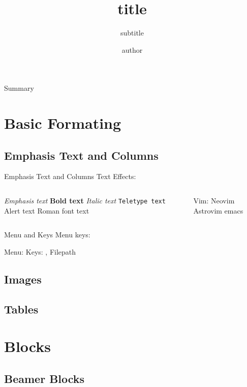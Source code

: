 \documentclass[aspectratio=169,tokyonightday,12pt]{darkbeamer}
\author{author}
\title{title}
\subtitle{subtitle}
\institute{My University}
\begin{document}
\begin{frame}{}
	\titlepage
\end{frame}

\begin{frame}{Summary}
	\tableofcontents
\end{frame}

\section{Basic Formating}
\subsection{Emphasis Text and Columns}
\begin{frame}{Emphasis Text and Columns}
	Text Effects:
	\begin{columns}[c]
		\begin{outline}
			\1 \emph{Emphasis text}
			\1 \textbf{Bold text}
			\1 \textit{Italic text}
			\1 \texttt{Teletype text}
			\1 \alert{Alert text}
			\1 \textrm{Roman font text}
		\end{outline}
		\column{.45\textwidth}
		\begin{outline}[enumerate]
			\1 Vim:
			\2 Neovim
			\2 Astrovim
			\1 emacs
		\end{outline}
	\end{columns}
\end{frame}

\begin{frame}{Menu and Keys}
    Menu keys:
    \begin{outline}
        \1 Menu: 
		  \1 Keys: , \keys{\ctrl +v}
        \1 Filepath  
    \end{outline}
\end{frame}

\subsection{Images}
\subsection{Tables}

\section{Blocks}
\subsection{Beamer Blocks}
\end{document}
